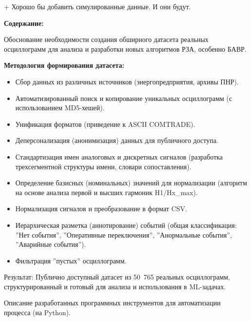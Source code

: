 + Хорошо бы добавить симулированные данные. И они будут.\par\vspace{0.2cm}
\noindent\textbf{Содержание:}\par\vspace{0.2cm}
Обоснование необходимости создания обширного датасета реальных осциллограмм для анализа и разработки новых алгоритмов РЗА, особенно БАВР.\par\vspace{0.2cm}
\noindent\textbf{Методология формирования датасета:}\par\vspace{0.2cm}
\begin{itemize}
  \item Сбор данных из различных источников (энергопредприятия, архивы ПНР).
  \item Автоматизированный поиск и копирование уникальных осциллограмм (с использованием MD5-хешей).
  \item Унификация форматов (приведение к ASCII COMTRADE).
  \item Деперсонализация (анонимизация) данных для публичного доступа.
  \item Стандартизация имен аналоговых и дискретных сигналов (разработка трехсегментной структуры имени, словари сопоставления).
  \item Определение базисных (номинальных) значений для нормализации (алгоритм на основе анализа первой и высших гармоник H1/Hx\_max).
  \item Нормализация сигналов и преобразование в формат CSV.
  \item Иерархическая разметка (аннотирование) событий (общая классификация: ''Нет события'', ''Оперативные переключения'', ''Анормальные события'', ''Аварийные события'').
  \item Фильтрация ''пустых'' осциллограмм.
\end{itemize}
Результат: Публично доступный датасет из 50 765 реальных осциллограмм, структурированный и готовый для анализа и использования в ML-задачах.\par\vspace{0.2cm}
Описание разработанных программных инструментов для автоматизации процесса (на Python).\par\vspace{0.2cm}
